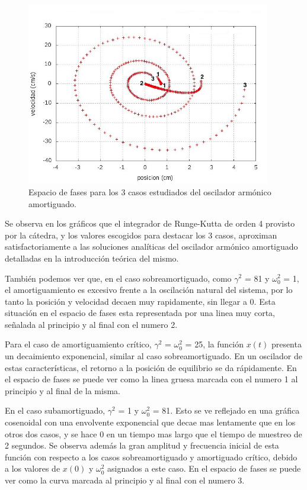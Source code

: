 \documentclass[a4paper,12pt]{article}
\begin{document}
\begin{figure}[H]
\begin{center}
\includegraphics[height=8cm]{grafico_ej2_xVSv.jpg}
\caption[width=5cm]{Espacio de fases para los 3 casos estudiados del oscilador arm\'onico amortiguado.}
\end{center}
\end{figure}

Se observa en los gr\'aficos que el integrador de Runge-Kutta de orden 4 provisto por la c\'atedra, y los valores escogidos para destacar los 3 casos, aproximan satisfactoriamente a las soluciones anal\'iticas del oscilador arm\'onico amortiguado detalladas en la introducci\'on te\'orica del mismo.

Tambi\'en podemos ver que, en el caso sobreamortiguado, como $\gamma^2$ = 81 y $\omega_0^2$ = 1, el amortiguamiento es excesivo frente a la oscilaci\'on natural del sistema, por lo tanto la posici\'on y velocidad decaen muy rapidamente, sin llegar a 0. Esta situaci\'on en el espacio de fases esta representada por una linea muy corta, se\~nalada al principio y al final con el numero 2.

Para el caso de amortiguamiento cr\'itico, $\gamma^2$ = $\omega_0^2$ = 25, la funci\'on $x(t)$ presenta un decaimiento exponencial, similar al caso sobreamortiguado. En un oscilador de estas caracter\'isticas, el retorno a la posici\'on de equilibrio se da r\'apidamente. En el espacio de fases se puede ver como la linea gruesa marcada con el numero 1 al principio y al final de la misma.

En el caso subamortiguado, $\gamma^2$ = 1 y $\omega_0^2$ = 81. Esto se ve reflejado en una gr\'afica cosenoidal con una envolvente exponencial que decae mas lentamente que en los otros dos casos, y se hace 0 en un tiempo mas largo que el tiempo de muestreo de 2 segundos. \newline
Se observa adem\'as la gran amplitud y frecuencia inicial de esta funci\'on con respecto a los casos sobreamortiguado y amortiguado cr\'itico, debido a los valores de ${x}(0)$ y $\omega_0^2$ asignados a este caso. En el espacio de fases se puede ver como la curva marcada al principio y al final con el numero 3.
\end{document}
